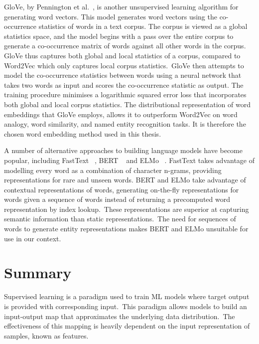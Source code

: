 \noindent GloVe, by Pennington et al.\unskip~\citep{pennington2014glove}, is another unsupervised learning algorithm for generating word vectors. This model generates word vectors using the co-occurrence statistics of words in a text corpus. The corpus is viewed as a global statistics space, and the model begins with a pass over the entire corpus to generate a co-occurrence matrix of words against all other words in the corpus. GloVe thus captures both global and local statistics of a corpus, compared to Word2Vec which only captures local corpus statistics.\ GloVe then attempts to model the co-occurrence statistics between words using a neural network that takes two words as input and scores the co-occurrence statistic as output. The training procedure minimises a logarithmic squared error loss that incorporates both global and local corpus statistics. The distributional representation of word embeddings that GloVe employs, allows it to outperform Word2Vec on word analogy, word similarity, and named entity recognition tasks. It is therefore the chosen word embedding method used in this thesis. \par

\noindent A number of alternative approaches to building language models have become popular, including FastText \unskip~\citep{bojanowski2016enriching}, BERT \unskip~\citep{vaswani2017attention} and ELMo \unskip~\citep{peters2018deep}. FastText takes advantage of modelling every word as a combination of character n-grams, providing representations for rare and unseen words. BERT and ELMo take advantage of contextual representations of words, generating on-the-fly representations for words given a sequence of words instead of returning a precomputed word representation by index lookup.\ These representations are superior at capturing semantic information than static representations.\ The need for sequences of words to generate entity representations makes BERT and ELMo unsuitable for use in our context.



\section{Summary}

Supervised learning is a paradigm used to train ML models where target output is provided with corresponding input.\ This paradigm allows models to build an input-output map that approximates the underlying data distribution.\ The effectiveness of this mapping is heavily dependent on the input representation of samples, known as features. \par

